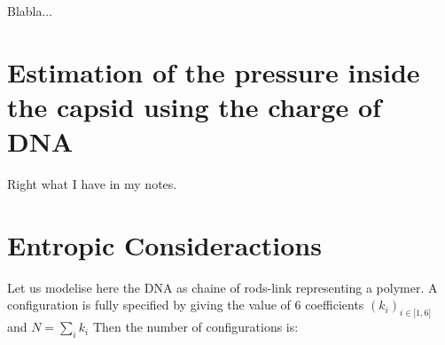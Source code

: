\documentclass{article}
\begin{document}
Blabla... 








\section{Estimation of the pressure inside the capsid using the charge of DNA}

Right what I have in my notes.

\section{Entropic Consideractions}
Let us modelise here the DNA as chaine of rods-link representing a polymer. A configuration is fully specified by giving the value of 6 coefficients $(k_i)_{i\in \mathbf{[} 1, 6 \mathbf{]}} $ and $N=\sum_i k_i$
Then the number of configurations is:
\end{document}
